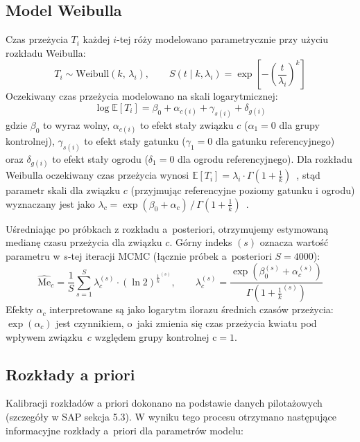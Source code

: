 \documentclass[12pt, a4paper]{article}
\begin{document}
\subsection{Model Weibulla}

Czas przeżycia $T_i$ każdej $i$-tej róży modelowano parametrycznie przy użyciu rozkładu Weibulla:
\begin{equation}
    T_i \sim \mathrm{Weibull}(k,\,\lambda_i), \qquad
    S(t \mid k, \lambda_i) = \exp\!\left[-\!\left(\frac{t}{\lambda_i}\right)^{\!k}\right]
\end{equation}
Oczekiwany czas przeżycia modelowano na skali logarytmicznej:
\begin{equation}
    \log \mathbb{E}[T_i] = \beta_0 + \alpha_{c(i)} + \gamma_{s(i)} + \delta_{g(i)}
\end{equation}
gdzie $\beta_0$ to wyraz wolny, $\alpha_{c(i)}$ to efekt stały związku $c$ ($\alpha_1 = 0$ dla grupy kontrolnej), $\gamma_{s(i)}$ to efekt stały gatunku ($\gamma_1 = 0$ dla gatunku referencyjnego) oraz $\delta_{g(i)}$ to efekt stały ogrodu ($\delta_1 = 0$ dla ogrodu referencyjnego). Dla rozkładu Weibulla oczekiwany czas przeżycia wynosi $\mathbb{E}[T_i] = \lambda_i\cdot\Gamma(1+\frac{1}{k})$~\cite{stan_survival}, stąd parametr skali dla związku $c$ (przyjmując referencyjne poziomy gatunku i ogrodu) wyznaczany jest jako $\lambda_c = \exp(\beta_0 + \alpha_c)\,/\,\Gamma(1+\frac{1}{k})$~\cite{brms_families}.

Uśredniając po próbkach z rozkładu a~posteriori, otrzymujemy estymowaną medianę czasu przeżycia dla związku $c$. Górny indeks $(s)$ oznacza wartość parametru w $s$-tej iteracji MCMC (łącznie próbek a~posteriori $S = 4000$):
\begin{equation}
    \widehat{\mathrm{Me}}_c = \frac{1}{S}\sum_{s=1}^{S} \lambda_c^{(s)} \cdot (\ln 2)^{{\frac{1}{k}}^{(s)}}, \qquad
    \lambda_c^{(s)} = \frac{\exp\!\left(\beta_0^{(s)} + \alpha_c^{(s)}\right)}{\Gamma\!\left(1 + \frac{1}{k}^{(s)}\right)}
\end{equation}
Efekty $\alpha_c$ interpretowane są jako logarytm ilorazu średnich czasów przeżycia: $\exp(\alpha_c)$ jest czynnikiem, o~jaki zmienia się czas przeżycia kwiatu pod wpływem związku~$c$ względem grupy kontrolnej c$=1$.

\subsection{Rozkłady a priori}

Kalibracji rozkładów a priori dokonano na podstawie danych pilotażowych (szczegóły w SAP sekcja 5.3). W wyniku tego procesu otrzymano następujące informacyjne rozkłady a~priori dla parametrów modelu:
\end{document}
